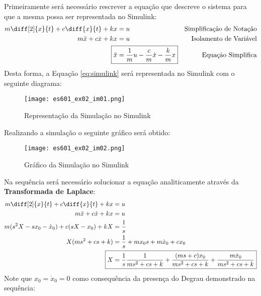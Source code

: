 \documentclass{article}
\begin{document}
            \begin{resolution}
                Primeiramente será necessário rescrever a equação que descreve o sistema para que a mesma possa ser representada no Simulink:
                    \begin{align}
                        m\diff[2]{x}{t} + c\diff{x}{t} + kx &= u & \text{Simplificação de Notação\nonumber}\\
                        m\ddot{x} + c\dot{x} + kx           &= u & \text{Isolamento de Variável}\nonumber\\
                        \Aboxed{\ddot{x} &= \frac{1}{m}u - \frac{c}{m}\dot{x} - \frac{k}{m}x}   & \text{Equação Simplifica}\label{eq:simulink}
                    \end{align}
                Desta forma, a Equação \ref{eq:simulink} será representada no Simulink com o seguinte diagrama:
                    \begin{figure}[H]
                        \centering
                        \texttt{[image: es601\_ex02\_im01.png]}
                        \caption{Representação da Simulação no Simulink}
                    \end{figure}
\newpage
                Realizando a simulação o seguinte gráfico será obtido:
                    \begin{figure}[H]
                        \centering
                        \texttt{[image: es601\_ex02\_im02.png]}
                        \caption{Gráfico da Simulação no Simulink}
                    \end{figure}
                Na sequência será necessário solucionar a equação analiticamente através da \textbf{Transformada de Laplace}:
                    \begin{align}
                        m\diff[2]{x}{t} + c\diff{x}{t} + kx &= u \nonumber\\
                        m\ddot{x} + c\dot{x} + kx           &= u \nonumber\\
                        m(s^2X - sx_{0} -\dot{x}_{0}) + c(sX - x_{0}) + kX & = \frac{1}{s}\nonumber\\
                        X(ms^2 + cs + k) &= \frac{1}{s} + mx_{0}s + m\dot{x}_{0} + cx_{0}\nonumber\\
                        \Aboxed{X &= \frac{1}{s}\frac{1}{ms^2 + cs + k} + \frac{(ms + c)x_{0}}{ms^2 + cs + k} + \frac{m\dot{x}_{0}}{ms^2 + cs + k}}
                    \end{align}
                Note que $x_{0} = \dot{x}_{0} = 0$ como consequência da presença do Degrau demonstrado na sequência:

\end{resolution}
\end{document}

